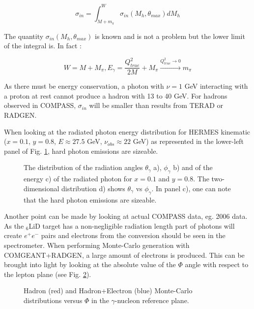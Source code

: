\begin{equation}
    \sigma_{in} = \int_{M+m_{\pi}}^{W}\sigma_{in}(M_{h},\theta_{max})dM_h
\end{equation}

The quantity $\sigma_{in}(M_{h},\theta_{max})$ is known and is not a problem but the lower limit of the integral is. In fact :

\begin{equation}
    W = M + M_{\pi}, E_{\gamma} = \frac{Q^2_{true}}{2M}+M_{\pi} \xrightarrow{Q^2_{true} \rightarrow 0} m_{\pi}
\end{equation}

As there must be energy conservation, a photon with $\nu = 1$ GeV interacting with a proton at rest cannot produce a hadron with
13 to 40 GeV. For hadrons observed in COMPASS, $\sigma_{in}$ will be smaller than results from TERAD or RADGEN.

When looking at the radiated photon energy distribution for HERMES kinematic ($x=0.1$, $y=0.8$, $E\approx27.5$ GeV, $\nu_{obs}\approx22$ GeV)
as represented in the lower-left panel of Fig. \ref{fig:RAD}, hard photon emissions are sizeable.

\begin{figure}[htb]
\centerline{}
\caption{The distribution of the radiation angles $\theta_{\gamma}$ a), $\phi_{\gamma}$ b) and of the energy c) of the radiated
photon for $x=0.1$ and $y=0.8$. The two-dimensional distribution d) shows $\theta_{\gamma}$ vs $\phi_{\gamma}$. In panel c), one
can note that the hard photon emissions are sizeable.}\label{fig:RAD}
\end{figure}

Another point can be made by looking at actual COMPASS data, eg. 2006 data. As the $_{6}$LiD target has a non-negligible radiation length
part of photons will create $e^+e^-$ pairs and electrons from the conversion should be seen in the spectrometer. When performing Monte-Carlo generation
with COMGEANT+RADGEN, a large amount of electrons is produced. This can be brought into light by looking at the absolute value of the $\Phi$ angle
with respect to the lepton plane (see Fig. \ref{fig:elprod}).

\begin{figure}[htb!]
\centerline{}
\caption{Hadron (red) and Hadron+Electron (blue) Monte-Carlo distributions versus $\Phi$ in the $\gamma$-nucleon reference plane.}\label{fig:elprod}
\end{figure}

